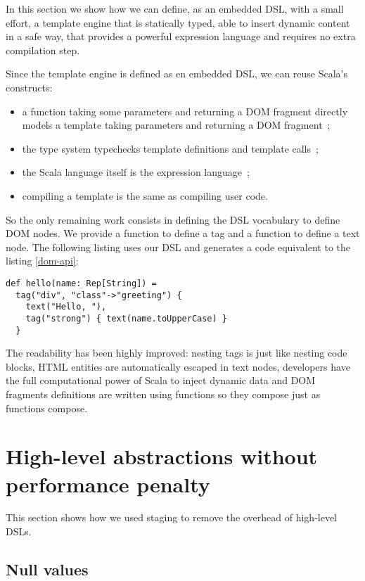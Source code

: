 \documentclass[american,english,runningheads]{llncs}
\begin{document}
In this section we show how we can define, as an embedded DSL, with a small effort, a template engine that is statically typed, able to insert dynamic content in a safe way, that provides a powerful expression language and requires no extra compilation step.

Since the template engine is defined as en embedded DSL, we can reuse Scala’s constructs:

\begin{itemize}
\item a function taking some parameters and returning a DOM fragment directly models a template taking parameters and returning a DOM fragment~;
\item the type system typechecks template definitions and template calls~;
\item the Scala language itself is the expression language~;
\item compiling a template is the same as compiling user code.
\end{itemize}

So the only remaining work consists in defining the DSL vocabulary to define DOM nodes. We provide a  function to define a tag and a  function to define a text node. The following listing uses our DSL and generates a code equivalent to the listing \ref{dom-api}:

\begin{lstlisting}[label=forest-hello,caption=DOM definition DSL]
def hello(name: Rep[String]) =
  tag("div", "class"->"greeting") {
    text("Hello, "),
    tag("strong") { text(name.toUpperCase) }
  }
\end{lstlisting}

The readability has been highly improved: nesting tags is just like nesting code blocks, HTML entities are automatically escaped in text nodes, developers have the full computational power of Scala to inject dynamic data and DOM fragments definitions are written using functions so they compose just as functions compose.

\section{High-level abstractions without performance penalty}

This section shows how we used staging to remove the overhead of high-level DSLs.

\subsection{Null values}
\end{document}
